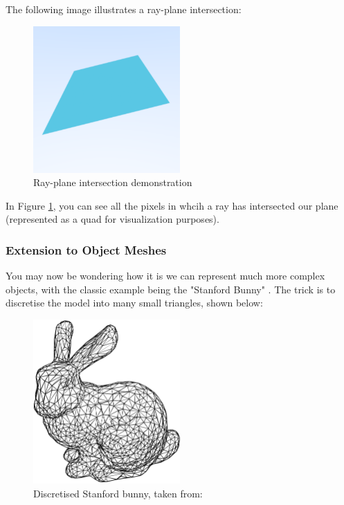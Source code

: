 \documentclass[12pt]{article}
\begin{document}
The following image illustrates a ray-plane intersection:

\begin{figure}[H]
    \centering
    \includegraphics[width=0.5\textwidth]{images/intersections/ray_quad_intersection.png}
    \caption{Ray-plane intersection demonstration}
    \label{fig:rayplaneintersection}
\end{figure}

In Figure \ref{fig:rayplaneintersection}, you can see all the pixels in whcih a ray has intersected our plane (represented as a quad for visualization purposes).

\subsubsection{Extension to Object Meshes}

You may now be wondering how it is we can represent much more complex objects, with the classic example being the "Stanford Bunny" \cite{stanfordbunny}. The trick is to discretise the model into many small triangles, shown below:
\begin{figure}[H]
    \centering
    \includegraphics[width=0.5\textwidth]{images/stanford_bunny.png}
    \caption{Discretised Stanford bunny, taken from: \cite{discretebunny}}
    \label{fig:discretebunny}
\end{figure}
\end{document}
